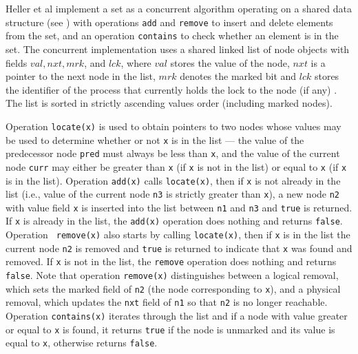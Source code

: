 \documentclass{article}
\theoremstyle{plain}
\newcounter{thm}
\theoremstyle{definition}
\begin{document}
Heller et al \cite{HHLMSS07} implement a set as a concurrent algorithm
operating on a shared data structure (see ) with
operations {\tt add} and {\tt remove} to insert and delete elements
from the set, and an operation {\tt contains} to check whether an
element is in the set. The concurrent implementation uses a shared
linked list of node objects with fields $val, nxt, mrk$, and $lck$,
where $val$ stores the value of the node, $nxt$ is a pointer to the
next node in the list, $mrk$ denotes the marked bit and $lck$ stores
the identifier of the process that currently holds the lock to the
node (if any) \cite{HHLMSS07}.  The list is sorted in strictly
ascending values order (including marked nodes).

Operation {\tt locate(x)} is used to obtain pointers to two nodes
whose values may be used to determine whether or not {\tt x} is in the
list --- the value of the predecessor node {\tt pred} must always be
less than {\tt x}, and the value of the current node {\tt curr} may
either be greater than {\tt x} (if {\tt x} is not in the list) or
equal to {\tt x} (if {\tt x} is in the list). Operation {\tt add(x)}
calls {\tt locate(x)}, then if {\tt x} is not already in the list
(i.e., value of the current node {\tt n3} is strictly greater than
{\tt x}), a new node {\tt n2} with value field {\tt x} is inserted
into the list between {\tt n1} and {\tt n3} and {\tt true} is
returned. If {\tt x} is already in the list, the {\tt add(x)}
operation does nothing and returns {\tt false}. Operation {\tt
  remove(x)} also starts by calling {\tt locate(x)}, then if {\tt x}
is in the list the current node {\tt n2} is removed and {\tt true} is
returned to indicate that {\tt x} was found and removed. If {\tt x} is
not in the list, the {\tt remove} operation does nothing and returns
{\tt false}. Note that operation {\tt remove(x)} distinguishes between
a logical removal, which sets the marked field of {\tt n2} (the node
corresponding to {\tt x}), and a physical removal, which updates the
{\tt nxt} field of {\tt n1} so that {\tt n2} is no longer
reachable. Operation {\tt contains(x)} iterates through the list and
if a node with value greater or equal to {\tt x} is found, it returns
{\tt true} if the node is unmarked and its value is equal to {\tt x},
otherwise returns {\tt false}.
\end{document}
